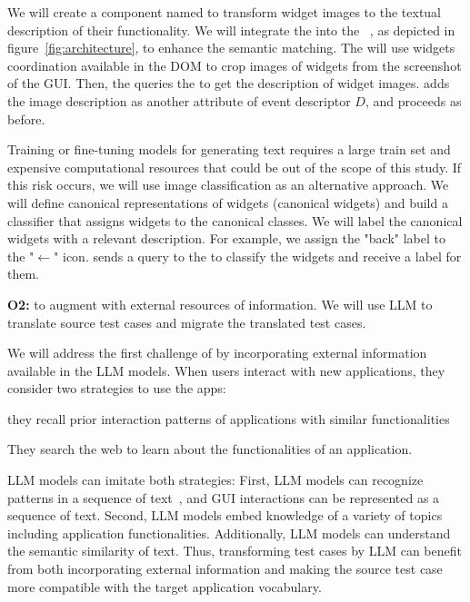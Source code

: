 \smallskip
We will create a component named \imagelabeler to transform widget images to the textual description of their functionality.
We will integrate the \imagelabeler into the \testreuse~\architecture, as depicted in figure~\ref{fig:architecture}, to enhance the semantic matching.
The \ede  will use widgets coordination available in the DOM to crop images of widgets from the screenshot of the GUI.
Then, the \ede queries the \imagelabeler to get the description of  widget images.
\ede adds the image description as another attribute of event descriptor $D$, and \matcher proceeds as before.


\smallskip
Training or fine-tuning models for generating text requires a large train set and expensive computational resources that could be out of the scope of this study. 
If this risk occurs, we will use image classification as an alternative approach.
We will define canonical representations of widgets  (canonical widgets) and build a classifier that assigns widgets to the canonical classes.
We will label the canonical widgets with a relevant description.
For example, we assign the "back" label to the "$\leftarrow$" icon.
\ede sends a query to the \imagelabeler to classify the widgets and receive a label for them.



\bigskip 
\noindent
\textbf{O2:} to augment \testreuse with external resources of information.
We will use LLM to translate source test cases and migrate the translated test cases.

\smallskip
We will  address the first challenge of \testreuse by incorporating external information available in the LLM models.
When users interact with new applications, they consider two strategies to use the apps:
\begin{inparaenum}[(i)]
\item they recall prior  interaction patterns of  applications with similar functionalities
\item They search the web to learn about the functionalities of an application.
\end{inparaenum}
LLM models can imitate both strategies:
First, LLM models can recognize patterns in a sequence of text~\cite{Pandey:TransDPR:EMSE:2023}, and GUI interactions can be  represented as a sequence of text. 
Second, LLM models embed knowledge of a variety of topics including application functionalities.
Additionally, LLM models can understand the semantic similarity of text. 
Thus, transforming test cases by LLM can benefit from both incorporating external information and making the source test case more compatible with the target application vocabulary.


